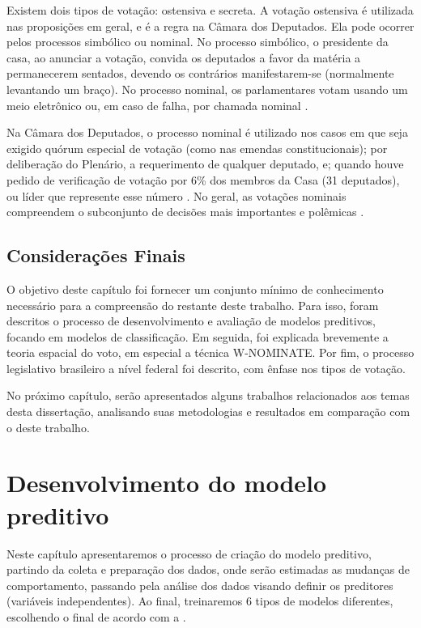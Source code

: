 \documentclass[a4paper,titlepage]{ppgi}\usepackage[]{graphicx}\usepackage[]{color}
\begin{document}
Existem dois tipos de votação: ostensiva e secreta. A votação ostensiva é
utilizada nas proposições em geral, e é a regra na Câmara dos Deputados. Ela
pode ocorrer pelos processos simbólico ou nominal. No processo simbólico, o
presidente da casa, ao anunciar a votação, convida os deputados a favor da
matéria a permanecerem sentados, devendo os contrários manifestarem-se
(normalmente levantando um braço). No processo nominal, os parlamentares votam
usando um meio eletrônico ou, em caso de falha, por chamada nominal
\cite{Carneiro2013}.

Na Câmara dos Deputados, o processo nominal é utilizado nos casos em que seja
exigido quórum especial de votação (como nas emendas constitucionais); por
deliberação do Plenário, a requerimento de qualquer deputado, e; quando houve
pedido de verificação de votação por 6\% dos membros da Casa (31 deputados), ou
líder que represente esse número \cite[art. 186]{RICD2015}. No geral, as
votações nominais compreendem o subconjunto de decisões mais importantes e
polêmicas \cite{Figueiredo2001}.

\section{Considerações Finais}

O objetivo deste capítulo foi fornecer um conjunto mínimo de conhecimento
necessário para a compreensão do restante deste trabalho. Para isso, foram
descritos o processo de desenvolvimento e avaliação de modelos preditivos,
focando em modelos de classificação. Em seguida, foi explicada brevemente a
teoria espacial do voto, em especial a técnica W-NOMINATE. Por fim, o processo
legislativo brasileiro a nível federal foi descrito, com ênfase nos tipos de
votação.

No próximo capítulo, serão apresentados alguns trabalhos relacionados aos temas
desta dissertação, analisando suas metodologias e resultados em comparação com
o deste trabalho.






\chapter{Desenvolvimento do modelo preditivo}\label{cap:desenvolvimento}

Neste capítulo apresentaremos o processo de criação do modelo preditivo,
partindo da coleta e preparação dos dados, onde serão estimadas as mudanças de
comportamento, passando pela análise dos dados visando definir os preditores
(variáveis independentes). Ao final, treinaremos 6 tipos de modelos diferentes,
escolhendo o final de acordo com a .
\end{document}
